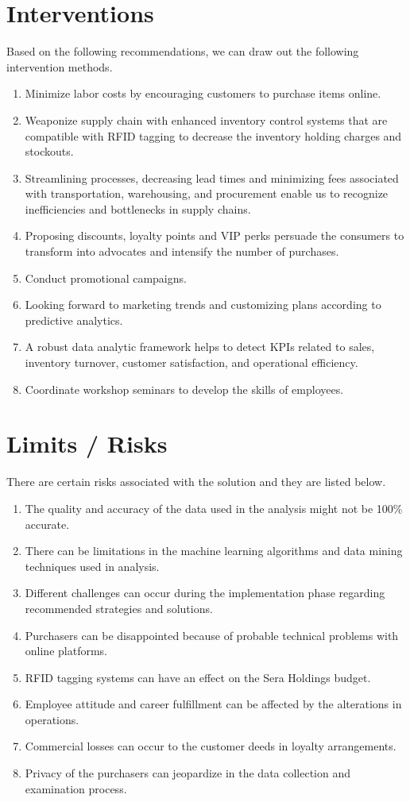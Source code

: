 \documentclass[12pt,a4Paper]{article}
\begin{document}
\section{Interventions}
Based on the following recommendations, we can draw out the following intervention methods.
\begin{enumerate}
\item Minimize labor costs by encouraging customers to purchase items online.
\item Weaponize supply chain with enhanced inventory control systems that are compatible with RFID tagging to decrease the inventory holding charges and stockouts.
\item Streamlining processes, decreasing lead times and minimizing fees associated with transportation, warehousing, and procurement enable us to recognize inefficiencies and bottlenecks in supply chains.
\item Proposing discounts, loyalty points and VIP perks persuade the consumers to transform into advocates and intensify the number of purchases. 
\item Conduct promotional campaigns. 
\item Looking forward to marketing trends and customizing plans according to predictive analytics.
\item A robust data analytic framework helps to detect KPIs related to sales, inventory turnover, customer satisfaction, and operational efficiency.
\item Coordinate workshop seminars to develop the skills of employees.
\end{enumerate}
\section{Limits / Risks}
There are certain risks associated with the solution and they are listed below.
\begin{enumerate}
\item The quality and accuracy of the data used in the analysis might not be 100\% accurate.
\item There can be limitations in the machine learning algorithms and data mining techniques used in analysis.
\item Different challenges can occur during the implementation phase regarding recommended strategies and solutions.
\item Purchasers can be disappointed because of probable technical problems with online platforms.
\item RFID tagging systems can have an effect on the Sera Holdings budget.
\item Employee attitude and career fulfillment can be affected by the alterations in operations.
\item Commercial losses can occur to the customer deeds in loyalty arrangements.
\item Privacy of the purchasers can jeopardize in the data collection and examination process.
\end{enumerate}
\end{document}

